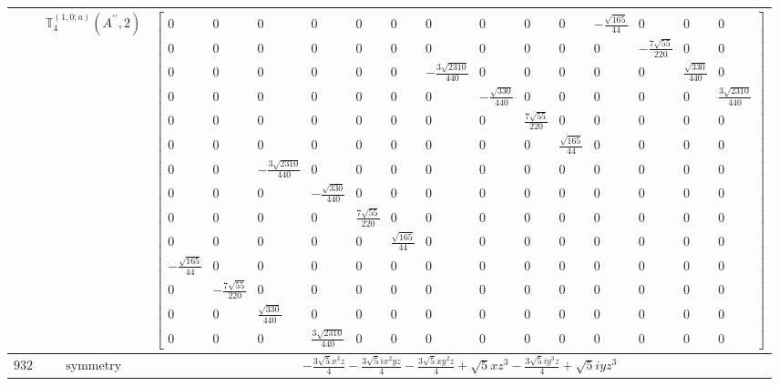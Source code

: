 \documentclass[fleqn,8pt,landscape]{jsarticle}
\begin{document}
\begin{longtable}{ccc}
$  $ & $ \mathbb{T}_{4}^{(1,0;a)}(A^{\prime\prime},2) $ & $ \begin{bmatrix} 0 & 0 & 0 & 0 & 0 & 0 & 0 & 0 & 0 & 0 & - \frac{\sqrt{165}}{44} & 0 & 0 & 0 \\ 0 & 0 & 0 & 0 & 0 & 0 & 0 & 0 & 0 & 0 & 0 & - \frac{7 \sqrt{55}}{220} & 0 & 0 \\ 0 & 0 & 0 & 0 & 0 & 0 & - \frac{3 \sqrt{2310}}{440} & 0 & 0 & 0 & 0 & 0 & \frac{\sqrt{330}}{440} & 0 \\ 0 & 0 & 0 & 0 & 0 & 0 & 0 & - \frac{\sqrt{330}}{440} & 0 & 0 & 0 & 0 & 0 & \frac{3 \sqrt{2310}}{440} \\ 0 & 0 & 0 & 0 & 0 & 0 & 0 & 0 & \frac{7 \sqrt{55}}{220} & 0 & 0 & 0 & 0 & 0 \\ 0 & 0 & 0 & 0 & 0 & 0 & 0 & 0 & 0 & \frac{\sqrt{165}}{44} & 0 & 0 & 0 & 0 \\ 0 & 0 & - \frac{3 \sqrt{2310}}{440} & 0 & 0 & 0 & 0 & 0 & 0 & 0 & 0 & 0 & 0 & 0 \\ 0 & 0 & 0 & - \frac{\sqrt{330}}{440} & 0 & 0 & 0 & 0 & 0 & 0 & 0 & 0 & 0 & 0 \\ 0 & 0 & 0 & 0 & \frac{7 \sqrt{55}}{220} & 0 & 0 & 0 & 0 & 0 & 0 & 0 & 0 & 0 \\ 0 & 0 & 0 & 0 & 0 & \frac{\sqrt{165}}{44} & 0 & 0 & 0 & 0 & 0 & 0 & 0 & 0 \\ - \frac{\sqrt{165}}{44} & 0 & 0 & 0 & 0 & 0 & 0 & 0 & 0 & 0 & 0 & 0 & 0 & 0 \\ 0 & - \frac{7 \sqrt{55}}{220} & 0 & 0 & 0 & 0 & 0 & 0 & 0 & 0 & 0 & 0 & 0 & 0 \\ 0 & 0 & \frac{\sqrt{330}}{440} & 0 & 0 & 0 & 0 & 0 & 0 & 0 & 0 & 0 & 0 & 0 \\ 0 & 0 & 0 & \frac{3 \sqrt{2310}}{440} & 0 & 0 & 0 & 0 & 0 & 0 & 0 & 0 & 0 & 0 \end{bmatrix} $ \\ \hline
$ 932 $ & $ \text{symmetry} $ & $ - \frac{3 \sqrt{5} x^{3} z}{4} - \frac{3 \sqrt{5} i x^{2} y z}{4} - \frac{3 \sqrt{5} x y^{2} z}{4} + \sqrt{5} x z^{3} - \frac{3 \sqrt{5} i y^{3} z}{4} + \sqrt{5} i y z^{3} $ \\

\end{longtable}
\end{document}
